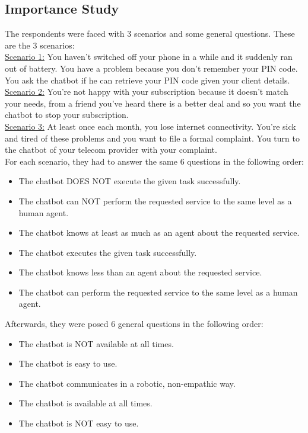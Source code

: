 \begin{appendices}
	\subsection{Importance Study}
	The respondents were faced with 3 scenarios and some general questions. These are the 3 scenarios:\\
	\ul{Scenario 1:} You haven't switched off your phone in a while and it suddenly ran out of battery. You have a problem because you don't remember your PIN code. You ask the chatbot if he can retrieve your PIN code given your client details.\\
	\break
	\ul{Scenario 2:} You're not happy with your subscription because it doesn't match your needs, from a friend you've heard there is a better deal and so you want the chatbot to stop your subscription.\\
	\break
	\ul{Scenario 3:} At least once each month, you lose internet connectivity. You're sick and tired of these problems and you want to file a formal complaint. You turn to the chatbot of your telecom provider with your complaint.\\
	\break
	For each scenario, they had to answer the same 6 questions in the following order:
	\begin{itemize}
		\item The chatbot DOES NOT execute the given task successfully.
		\item The chatbot can NOT perform the requested service to the same level as a human agent.
		\item The chatbot knows at least as much as an agent about the requested service.
		\item The chatbot executes the given task successfully.
		\item The chatbot knows less than an agent about the requested service.
		\item The chatbot can perform the requested service to the same level as a human agent.
	\end{itemize}
	Afterwards, they were posed 6 general questions in the following order:
	\begin{itemize}
		\item The chatbot is NOT available at all times.
		\item The chatbot is easy to use.
		\item The chatbot communicates in a robotic, non-empathic way.
		\item The chatbot is available at all times. 
		\item The chatbot is NOT easy to use.

\end{itemize}
\end{appendices}
